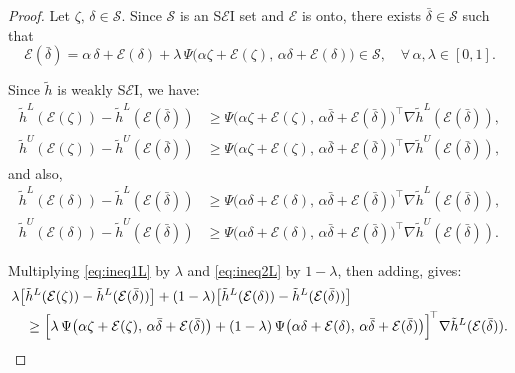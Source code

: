 \documentclass[12pt, reqno]{amsart}
\theoremstyle{definition}
\theoremstyle{remark}
\numberwithin{equation}{section}
\begin{document}
\begin{proof}
    Let $\zeta,\, \delta \in \mathcal{S}$. Since $\mathcal{S}$ is an S$\mathcal{E}$I set and $\mathcal{E}$ is onto, there exists $\bar{\delta} \in \mathcal{S}$ such that
    \begin{equation}\label{eq:bar_delta}
        \mathcal{E}(\bar{\delta}) 
        = \alpha\, \delta + \mathcal{E}(\delta) + \lambda\, \Psi\big(\alpha \zeta + \mathcal{E}(\zeta),\, \alpha \delta + \mathcal{E}(\delta)\big)
        \in \mathcal{S},
        \quad \forall\, \alpha, \lambda \in [0,1].
    \end{equation}

    Since $\tilde{h}$ is weakly S$\mathcal{E}$I, we have:
    \begin{align}
        \tilde{h}^L(\mathcal{E}(\zeta)) - \tilde{h}^L(\mathcal{E}(\bar{\delta}))
        &\geq 
        \Psi\big(\alpha \zeta + \mathcal{E}(\zeta),\, \alpha \bar{\delta} + \mathcal{E}(\bar{\delta})\big)^{\!\top}
        \nabla \tilde{h}^L(\mathcal{E}(\bar{\delta})), 
        \label{eq:ineq1L} \\
        \tilde{h}^U(\mathcal{E}(\zeta)) - \tilde{h}^U(\mathcal{E}(\bar{\delta}))
        &\geq 
        \Psi\big(\alpha \zeta + \mathcal{E}(\zeta),\, \alpha \bar{\delta} + \mathcal{E}(\bar{\delta})\big)^{\!\top}
        \nabla \tilde{h}^U(\mathcal{E}(\bar{\delta})),
        \label{eq:ineq1U}
    \end{align}
    and also,
    \begin{align}
        \tilde{h}^L(\mathcal{E}(\delta)) - \tilde{h}^L(\mathcal{E}(\bar{\delta}))
        &\geq 
        \Psi\big(\alpha \delta + \mathcal{E}(\delta),\, \alpha \bar{\delta} + \mathcal{E}(\bar{\delta})\big)^{\!\top}
        \nabla \tilde{h}^L(\mathcal{E}(\bar{\delta})),
        \label{eq:ineq2L} \\[6pt]
        \tilde{h}^U(\mathcal{E}(\delta)) - \tilde{h}^U(\mathcal{E}(\bar{\delta}))
        &\geq 
        \Psi\big(\alpha \delta + \mathcal{E}(\delta),\, \alpha \bar{\delta} + \mathcal{E}(\bar{\delta})\big)^{\!\top}
        \nabla \tilde{h}^U(\mathcal{E}(\bar{\delta})).
        \label{eq:ineq2U}
    \end{align}

    Multiplying \eqref{eq:ineq1L} by $\lambda$ and \eqref{eq:ineq2L} by $1-\lambda$, then adding, gives:
    \begin{align}
        &\lambda\big[\tilde{h}^L(\mathcal{E}(\zeta)) - \tilde{h}^L(\mathcal{E}(\bar{\delta}))\big] 
        + (1-\lambda)\big[\tilde{h}^L(\mathcal{E}(\delta)) - \tilde{h}^L(\mathcal{E}(\bar{\delta}))\big] \notag\\
        &\quad \geq 
        \Big[
        \lambda\, \Psi\big(\alpha \zeta + \mathcal{E}(\zeta),\, \alpha \bar{\delta} + \mathcal{E}(\bar{\delta})\big) 
        + (1-\lambda)\, \Psi\big(\alpha \delta + \mathcal{E}(\delta),\, \alpha \bar{\delta} + \mathcal{E}(\bar{\delta})\big)
        \Big]^{\!\top} 
        \nabla \tilde{h}^L(\mathcal{E}(\bar{\delta})). 
        \label{eq:combineL}
    \end{align}


\end{proof}
\end{document}
